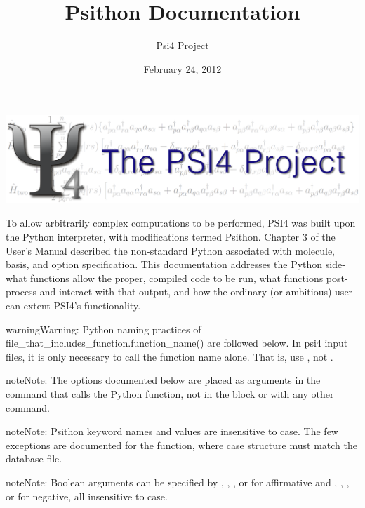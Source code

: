 \documentclass[letterpaper,10pt,english]{sphinxmanual}
\title{Psithon Documentation}
\date{February 24, 2012}
\author{Psi4 Project}
\begin{document}
\maketitle
\tableofcontents
{}\label{index::doc}
\includegraphics[width=1.000\linewidth]{PSI4_3.png}



To allow arbitrarily complex computations to be performed, PSI4 was built
upon the Python interpreter, with modifications termed Psithon. Chapter 3
of the User's Manual described the non-standard Python associated with
molecule, basis, and option specification. This documentation addresses
the Python side- what functions allow the proper, compiled code to be run,
what functions post-process and interact with that output, and how the
ordinary (or ambitious) user can extent PSI4's functionality.

\begin{notice}{warning}{Warning:}
Python naming practices of file\_that\_includes\_function.function\_name()
are followed below. In psi4 input files, it is only necessary to call the
function name alone. That is, use , not .
\end{notice}

\begin{notice}{note}{Note:}
The options documented below are placed as arguments in the command that
calls the Python function, not in the  block or with any
other  command.
\end{notice}

\begin{notice}{note}{Note:}
Psithon keyword names and values are insensitive to case. The few
exceptions are documented for the  function, where case
structure must match the database file.
\end{notice}

\begin{notice}{note}{Note:}
Boolean arguments can be specified by , , , or 
for affirmative and , , , or  for negative,
all insensitive to case.
\end{notice}
\end{document}
